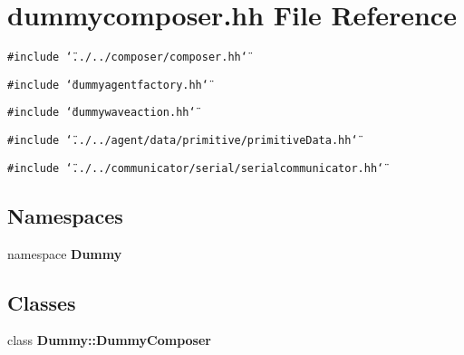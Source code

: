 \section{dummycomposer.hh File Reference}
\label{dummycomposer_8hh}


{\tt \#include \char`\"{}../../composer/composer.hh\char`\"{}}\par
{\tt \#include \char`\"{}dummyagentfactory.hh\char`\"{}}\par
{\tt \#include \char`\"{}dummywaveaction.hh\char`\"{}}\par
{\tt \#include \char`\"{}../../agent/data/primitive/primitiveData.hh\char`\"{}}\par
{\tt \#include \char`\"{}../../communicator/serial/serialcommunicator.hh\char`\"{}}\par
\subsection*{Namespaces}
\begin{CompactItemize}
\item 
namespace {\bf Dummy}
\end{CompactItemize}
\subsection*{Classes}
\begin{CompactItemize}
\item 
class {\bf Dummy::DummyComposer}
\end{CompactItemize}
